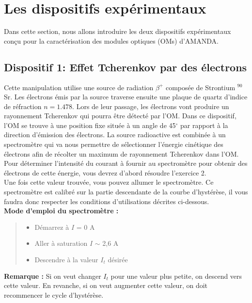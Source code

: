 \section{Les dispositifs expérimentaux}
Dans cette section, nous allons introduire les deux dispositifs expérimentaux conçu pour la caractérisation des modules optiques (OMs) d'AMANDA.

\subsection{Dispositif 1: Effet Tcherenkov par des électrons}

Cette manipulation utilise une source de radiation $\beta^+$ composée de Strontium $^{90}$Sr. Les électrons émis par la source traverse ensuite une plaque de quartz d'indice de réfraction  $n = 1.478$. Lors de leur passage, les électrons vont produire un rayonnement Tcherenkov qui pourra être détecté par l'OM. Dans ce dispositif, l'OM se trouve à une position fixe située à un angle de 45$^{\circ}$ par rapport à la direction d'émission des électrons. La source radioactive est combinée à un spectromètre qui va nous permettre de sélectionner l'énergie cinétique des électrons afin de récolter un maximum de rayonnement Tcherenkov dans l'OM. Pour déterminer l'intensité du courant à fournir au spectromètre pour obtenir des électrons de cette énergie, vous devrez d'abord résoudre l'exercice 2.\\

Une fois cette valeur trouvée, vous pouvez allumer le spectromètre. Ce spectromètre est calibré sur la partie descendante de la courbe d'hystérèse, il vous faudra donc respecter les conditions d'utilisations décrites ci-dessous.\\

\textbf{Mode d'emploi du spectromètre :}
\begin{quote}
    \begin{itemize}
        \item Démarrez à $I$ = 0 A
        \item Aller à saturation $I$ $\sim$ 2,6 A
        \item Descendre à la valeur $I_t$ désirée
    \end{itemize}
\end{quote}
\textbf{Remarque :} Si on veut changer $I_t$ pour une valeur plus petite, on descend vers cette valeur. En revanche, si on veut augmenter cette valeur, on doit recommencer le cycle d'hystérèse. 

